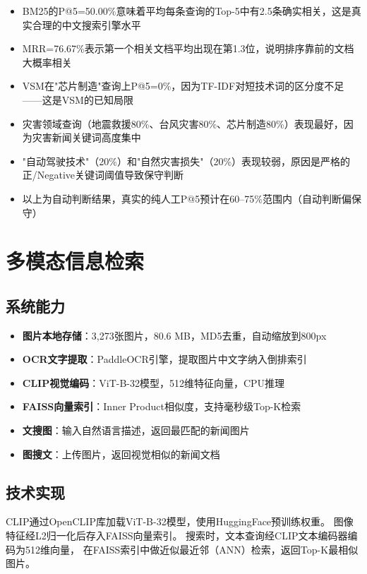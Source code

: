 \documentclass[12pt,a4paper]{ctexart}
\begin{document}
\begin{itemize}
    \item BM25的P@5=50.00\%意味着平均每条查询的Top-5中有2.5条确实相关，这是真实合理的中文搜索引擎水平
    \item MRR=76.67\%表示第一个相关文档平均出现在第1.3位，说明排序靠前的文档大概率相关
    \item VSM在"芯片制造"查询上P@5=0\%，因为TF-IDF对短技术词的区分度不足——这是VSM的已知局限
    \item 灾害领域查询（地震救援80\%、台风灾害80\%、芯片制造80\%）表现最好，因为灾害新闻关键词高度集中
    \item "自动驾驶技术"（20\%）和"自然灾害损失"（20\%）表现较弱，原因是严格的正/Negative关键词阈值导致保守判断
    \item 以上为自动判断结果，真实的纯人工P@5预计在60--75\%范围内（自动判断偏保守）
\end{itemize}

\section{多模态信息检索}

\subsection{系统能力}

\begin{itemize}
    \item \textbf{图片本地存储}：3,273张图片，80.6 MB，MD5去重，自动缩放到800px
    \item \textbf{OCR文字提取}：PaddleOCR引擎，提取图片中文字纳入倒排索引
    \item \textbf{CLIP视觉编码}：ViT-B-32模型，512维特征向量，CPU推理
    \item \textbf{FAISS向量索引}：Inner Product相似度，支持毫秒级Top-K检索
    \item \textbf{文搜图}：输入自然语言描述，返回最匹配的新闻图片
    \item \textbf{图搜文}：上传图片，返回视觉相似的新闻文档
\end{itemize}

\subsection{技术实现}

CLIP通过OpenCLIP库加载ViT-B-32模型，使用HuggingFace预训练权重。
图像特征经L2归一化后存入FAISS向量索引。
搜索时，文本查询经CLIP文本编码器编码为512维向量，
在FAISS索引中做近似最近邻（ANN）检索，返回Top-K最相似图片。
\end{document}
